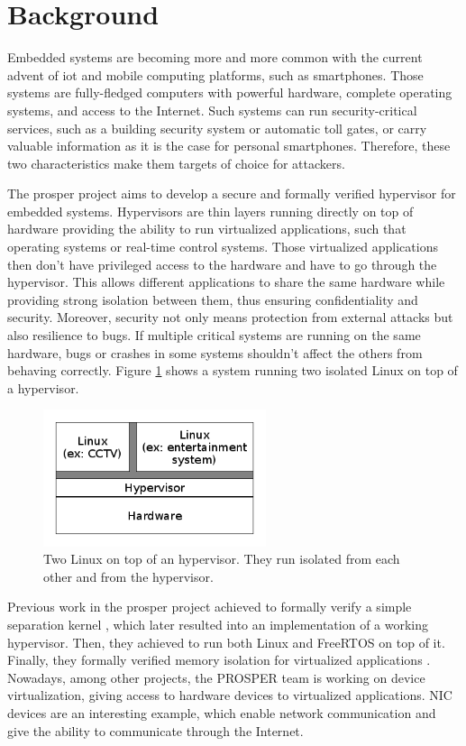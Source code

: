 \documentclass{kththesis}
\begin{document}
\section{Background}

Embedded systems are becoming more and more common with the current advent of \Gls{iot} and mobile computing platforms, such as smartphones. Those systems are fully-fledged computers with powerful hardware, complete operating systems, and access to the Internet. Such systems can run security-critical services, such as a building security system or automatic toll gates, or carry valuable information as it is the case for personal smartphones. Therefore, these two characteristics make them targets of choice for attackers.

The \gls{prosper} project \cite{noauthor_prosper:_nodate} aims to develop a secure and formally verified hypervisor for embedded systems. Hypervisors are thin layers running directly on top of hardware providing the ability to run virtualized applications, such that operating systems or real-time control systems. Those virtualized applications then don't have privileged access to the hardware and have to go through the hypervisor. This allows different applications to share the same hardware while providing strong isolation between them, thus ensuring confidentiality and security. Moreover, security not only means protection from external attacks but also resilience to bugs. If multiple critical systems are running on the same hardware, bugs or crashes in some systems shouldn't affect the others from behaving correctly. Figure \ref{figure-hypervisor-simple} shows a system running two isolated Linux on top of a hypervisor.

\begin{figure}[ht]
	\includegraphics[height=4cm]{figures/figure-hypervisor-simple.png}
	\centering
	\caption{Two Linux on top of an hypervisor. They run isolated from each other and from the hypervisor.}
	\label{figure-hypervisor-simple}
\end{figure}

Previous work in the \acrshort{prosper} project achieved to formally verify a simple separation kernel \cite{noauthor_prosper:_nodate-1,dam_formal_2013}, which later resulted into an implementation of a working hypervisor. Then, they achieved to run both Linux and \gls{FreeRTOS} on top of it. Finally, they formally verified memory isolation for virtualized applications \cite{nemati_trustworthy_2015}. Nowadays, among other projects, the PROSPER team is working on device virtualization, giving access to hardware devices to virtualized applications. \gls{NIC} devices are an interesting example, which enable network communication and give the ability to communicate through the Internet.
\end{document}
